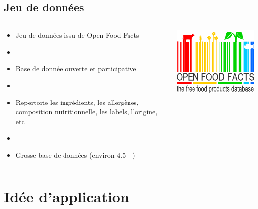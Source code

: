 \subsection{Jeu de données}
\begin{frame}{\insertsubsection}
  \begin{columns}
    \begin{column}{.6\textwidth}
      \begin{itemize}
        \item Jeu de données issu de Open Food Facts
        \item[]
        \item Base de donnée ouverte et participative
        \item[]
        \item Repertorie les ingrédients, les allergènes, composition nutritionnelle, les labels, l'origine, etc
        \item[]
        \item Grosse base de données (environ \qty{4.5}{\giga\octet})
      \end{itemize}
    \end{column}
    \begin{column}{.4\textwidth}
      \centering
      \includegraphics[width=.8\textwidth]{./openfoodfacts-logo-en.pdf}
    \end{column}
  \end{columns}
\end{frame}

\section{Idée d'application}
